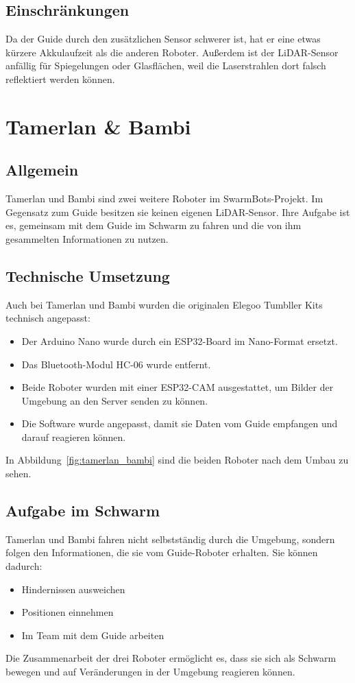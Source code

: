 \subsection{Einschränkungen}
Da der Guide durch den zusätzlichen Sensor schwerer ist, hat er eine etwas kürzere Akkulaufzeit als die anderen Roboter. Außerdem ist der LiDAR-Sensor anfällig für Spiegelungen oder Glasflächen, weil die Laserstrahlen dort falsch reflektiert werden können.

\section{Tamerlan \& Bambi}
\label{subsec:hardware_tamerlan_bambi}
\subsection{Allgemein}
Tamerlan und Bambi sind zwei weitere Roboter im SwarmBots-Projekt. Im Gegensatz zum Guide besitzen sie keinen eigenen LiDAR-Sensor. Ihre Aufgabe ist es, gemeinsam mit dem Guide im Schwarm zu fahren und die von ihm gesammelten Informationen zu nutzen.


\subsection{Technische Umsetzung}
Auch bei Tamerlan und Bambi wurden die originalen Elegoo Tumbller Kits technisch angepasst:
\begin{itemize}
    \item Der Arduino Nano wurde durch ein ESP32-Board im Nano-Format ersetzt.
    \item Das Bluetooth-Modul HC-06 wurde entfernt.
    \item Beide Roboter wurden mit einer ESP32-CAM ausgestattet, um Bilder der Umgebung an den Server senden zu können.
    \item Die Software wurde angepasst, damit sie Daten vom Guide empfangen und darauf reagieren können.
\end{itemize}
In Abbildung~\ref{fig:tamerlan_bambi} sind die beiden Roboter nach dem Umbau zu sehen.

\subsection{Aufgabe im Schwarm}
Tamerlan und Bambi fahren nicht selbstständig durch die Umgebung, sondern folgen den Informationen, die sie vom Guide-Roboter erhalten. Sie können dadurch:
\begin{itemize}
    \item Hindernissen ausweichen
    \item Positionen einnehmen
    \item Im Team mit dem Guide arbeiten
\end{itemize}
Die Zusammenarbeit der drei Roboter ermöglicht es, dass sie sich als Schwarm bewegen und auf Veränderungen in der Umgebung reagieren können.

